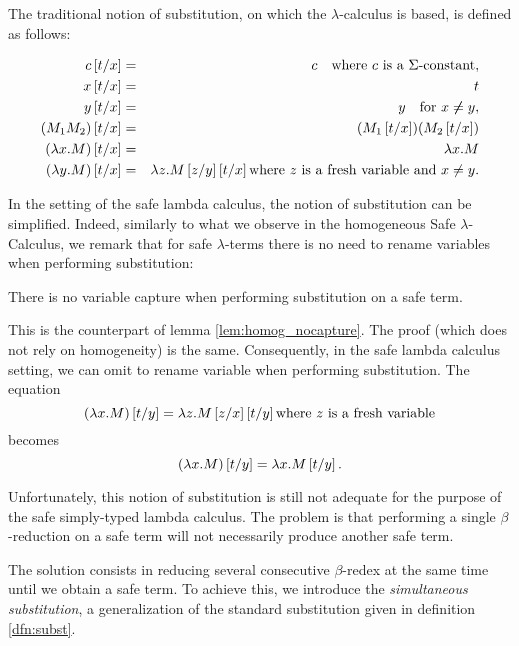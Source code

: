 The traditional notion of substitution, on which the
$\lambda$-calculus is based, is defined as follows:
\begin{dfn}[Substitution]
\label{dfn:subst}
\begin{eqnarray*}
c \left[ t/x \right] &=& c \quad \mbox{where $c$ is a $\Sigma$-constant},\\
x \left[ t/x \right] &=& t\\
 y\left[ t/x \right] &=& y \quad \mbox{for } x \not \neq y,\\
(M_1 M_2) \left[ t/x \right] &=& (M_1 \left[ t/x \right]) (M_2 \left[ t/x \right])\\
(\lambda x . M) \left[ t/x \right] &=& \lambda x . M\\
(\lambda y . M) \left[ t/x \right] &=& \lambda z . M \left[ z/y \right]
\left[ t/x \right] \mbox{where $z$ is a fresh variable and $x\not = y$}.
\end{eqnarray*}
\end{dfn}

In the setting of the safe lambda calculus, the notion of
substitution can be simplified. Indeed, similarly to what we observe
in the homogeneous Safe $\lambda$-Calculus, we remark that for safe
$\lambda$-terms there is no need to rename variables when performing
substitution:

\begin{lem}
\label{lem:noclash} There is no variable capture when performing
substitution on a safe term.
\end{lem}

This is the counterpart of lemma \ref{lem:homog_nocapture}. The
proof (which does not rely on homogeneity) is the same.
Consequently, in the safe lambda calculus setting, we can omit to
rename variable when performing substitution. The equation
$$(\lambda x . M) \left[ t/y \right] = \lambda z . M \left[ z/x \right]
\left[ t/y \right] \mbox{where $z$ is a fresh variable}$$ becomes
$$(\lambda x . M) \left[ t/y \right] = \lambda x . M \left[ t/y \right].$$

Unfortunately, this notion of substitution is still not adequate for
the purpose of the safe simply-typed lambda calculus. The problem is
that performing a single $\beta$-reduction on a safe term will not
necessarily produce another safe term.

The solution consists in reducing several consecutive $\beta$-redex
at the same time until we obtain a safe term. To achieve this, we
introduce the \emph{simultaneous substitution}, a generalization of
the standard substitution given in definition \ref{dfn:subst}.

